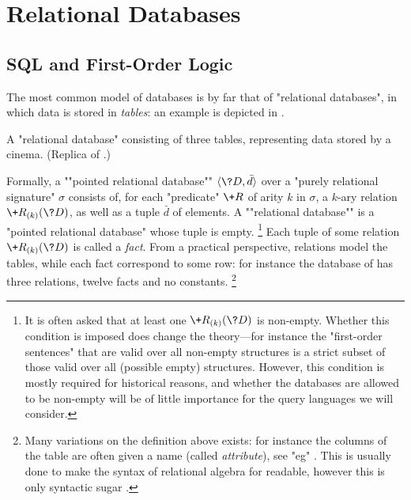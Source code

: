 \section{Relational Databases}

\subsection{SQL and First-Order Logic}


The most common model of databases is by far that of "relational databases",
in which data is stored in \emph{tables}: an example is depicted
in .

\begin{table}
	\centering%
	
	\caption{
		\AP\label{fig:relational-database-cinema}
		A "relational database" consisting of three tables, representing data
		stored by a cinema. (Replica of .)
	}
\end{table}

Formally, a \AP""pointed relational database"" $\tup{\?D, \bar d}$
over a "purely relational signature" $\sigma$
consists of, for each "predicate" $\+R$ of arity $k$ in $\sigma$,
a $k$-ary relation $\+R_{(k)}(\?D)$, as well as a tuple $\bar d$ of elements.%
A \AP""relational database"" is a "pointed relational database" whose tuple is empty.
\footnote{It is often asked that at least one $\+R_{(k)}(\?D)$ is non-empty.
Whether this condition is imposed does change the theory---for instance the "first-order sentences"
that are valid over all non-empty structures is a strict subset of
those valid over all (possible empty) structures.
However, this condition is mostly required for historical reasons,
and whether the databases are allowed to be non-empty
will be of little importance for the query languages we will consider.}
Each tuple of some relation $\+R_{(k)}(\?D)$ is called a \emph{fact}.
From a practical perspective, relations model the tables,
while each fact correspond to some row: for 
instance the database of 
has three relations, twelve facts and no constants.%
\footnote{Many variations on the definition above exists:
for instance the columns of the table are often given a name (called \emph{attribute}),
see "eg" \cite[\S\!\S~3.1--3.2]{AbiteboulHullVianu1995Databases}.
This is usually done to make the syntax of relational algebra for readable,
however this is only syntactic sugar \cite[Proposition~5.1.2]{AbiteboulHullVianu1995Databases}.}

